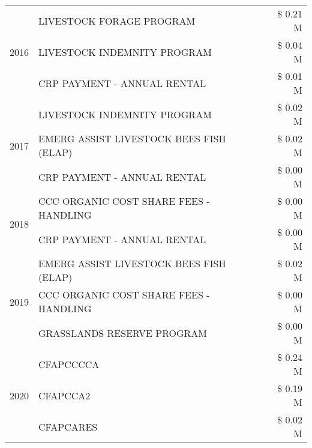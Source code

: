 \begin{tabular}{llr}
\cline{1-3}
\multirow[t]{3}{*}{2016} & LIVESTOCK FORAGE PROGRAM & \$ 0.21 M \\
 & LIVESTOCK INDEMNITY PROGRAM & \$ 0.04 M \\
 & CRP PAYMENT - ANNUAL RENTAL & \$ 0.01 M \\
\cline{1-3}
\multirow[t]{3}{*}{2017} & LIVESTOCK INDEMNITY PROGRAM & \$ 0.02 M \\
 & EMERG ASSIST LIVESTOCK BEES FISH (ELAP) & \$ 0.02 M \\
 & CRP PAYMENT - ANNUAL RENTAL & \$ 0.00 M \\
\cline{1-3}
\multirow[t]{2}{*}{2018} & CCC ORGANIC COST SHARE FEES - HANDLING & \$ 0.00 M \\
 & CRP PAYMENT - ANNUAL RENTAL & \$ 0.00 M \\
\cline{1-3}
\multirow[t]{3}{*}{2019} & EMERG ASSIST LIVESTOCK BEES FISH (ELAP) & \$ 0.02 M \\
 & CCC ORGANIC COST SHARE FEES - HANDLING & \$ 0.00 M \\
 & GRASSLANDS RESERVE PROGRAM & \$ 0.00 M \\
\cline{1-3}
\multirow[t]{3}{*}{2020} & CFAPCCCCA & \$ 0.24 M \\
 & CFAPCCA2 & \$ 0.19 M \\
 & CFAPCARES & \$ 0.02 M \\
\cline{1-3}
\bottomrule
\end{tabular}
